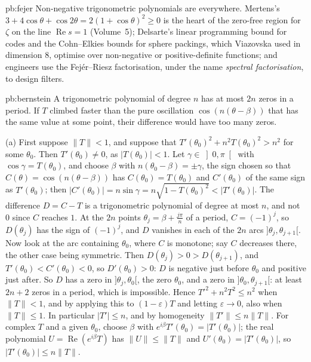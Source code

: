 \begin{solution}{pb:fejer}
\leads Non-negative trigonometric polynomials are everywhere. Mertens's $3+4\cos\theta+\cos2\theta=2(1+\cos\theta)^2\ge0$ is the heart of the zero-free
region for $\zeta$ on the line $\operatorname{Re}s=1$ (Volume~5); Delsarte's linear programming bound for codes and the Cohn--Elkies bounds for sphere packings,
which Viazovska used in dimension $8$, optimise over non-negative or positive-definite functions; and engineers use the Fejér--Riesz
factorisation, under the name \emph{spectral factorisation}, to design filters.
\end{solution}

\begin{solution}{pb:bernstein}
\idea A trigonometric polynomial of degree $n$ has at most $2n$ zeros in a period. If $T$ climbed faster than the pure oscillation
$\cos(n(\theta-\beta))$ that has the same value at some point, their difference would have too many zeros.

\writeup (a) First suppose $\|T\|<1$, and suppose that $T'(\theta_0)^2+n^2T(\theta_0)^2>n^2$ for some $\theta_0$. Then $T'(\theta_0)\ne0$, as $|T(\theta_0)|<1$. Let $\gamma\in\left]0,\pi\right[$ with
$\cos\gamma=T(\theta_0)$, and choose $\beta$ with $n(\theta_0-\beta)=\pm\gamma$, the sign chosen so that $C(\theta)=\cos(n(\theta-\beta))$ has $C(\theta_0)=T(\theta_0)$ and $C'(\theta_0)$ of the
same sign as $T'(\theta_0)$; then $|C'(\theta_0)|=n\sin\gamma=n\sqrt{1-T(\theta_0)^2}<|T'(\theta_0)|$. The difference $D=C-T$ is a trigonometric polynomial of degree at most
$n$, and not $0$ since $C$ reaches $1$. At the $2n$ points $\theta_j=\beta+\frac{j\pi}n$ of a period, $C=(-1)^j$, so $D(\theta_j)$ has the sign of $(-1)^j$, and $D$ vanishes in
each of the $2n$ arcs $]\theta_j,\theta_{j+1}[$. Now look at the arc containing $\theta_0$, where $C$ is monotone; say $C$ decreases there, the other case
being symmetric. Then $D(\theta_j)>0>D(\theta_{j+1})$, and $T'(\theta_0)<C'(\theta_0)<0$, so $D'(\theta_0)>0$: $D$ is negative just before $\theta_0$ and positive just after. So $D$
has a zero in $]\theta_j,\theta_0[$, the zero $\theta_0$, and a zero in $]\theta_0,\theta_{j+1}[$: at least $2n+2$ zeros in a period, which is impossible. Hence
$T'^2+n^2T^2\le n^2$ when $\|T\|<1$, and by applying this to $(1-\varepsilon)T$ and letting $\varepsilon\to0$, also when $\|T\|\le1$. In particular $|T'|\le n$, and by
homogeneity $\|T'\|\le n\|T\|$. For complex $T$ and a given $\theta_0$, choose $\beta$ with $e^{i\beta}T'(\theta_0)=|T'(\theta_0)|$; the real polynomial $U=\operatorname{Re}(e^{i\beta}T)$ has
$\|U\|\le\|T\|$ and $U'(\theta_0)=|T'(\theta_0)|$, so $|T'(\theta_0)|\le n\|T\|$.


\end{solution}
